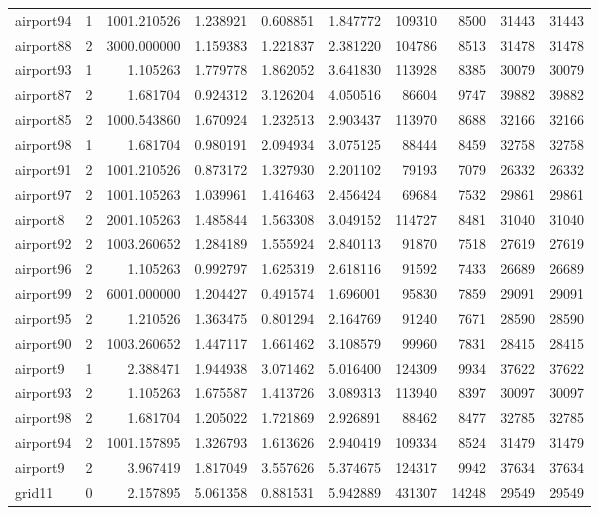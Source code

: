 \begin{longtable}{|l|r|r|r|r|r|r|r|r|r|}
airport94 & 1 & 1001.210526 & 1.238921 & 0.608851 & 1.847772 & 109310 & 8500 & 31443 & 31443 \\
airport88 & 2 & 3000.000000 & 1.159383 & 1.221837 & 2.381220 & 104786 & 8513 & 31478 & 31478 \\
airport93 & 1 & 1.105263 & 1.779778 & 1.862052 & 3.641830 & 113928 & 8385 & 30079 & 30079 \\
airport87 & 2 & 1.681704 & 0.924312 & 3.126204 & 4.050516 & 86604 & 9747 & 39882 & 39882 \\
airport85 & 2 & 1000.543860 & 1.670924 & 1.232513 & 2.903437 & 113970 & 8688 & 32166 & 32166 \\
airport98 & 1 & 1.681704 & 0.980191 & 2.094934 & 3.075125 & 88444 & 8459 & 32758 & 32758 \\
airport91 & 2 & 1001.210526 & 0.873172 & 1.327930 & 2.201102 & 79193 & 7079 & 26332 & 26332 \\
airport97 & 2 & 1001.105263 & 1.039961 & 1.416463 & 2.456424 & 69684 & 7532 & 29861 & 29861 \\
airport8 & 2 & 2001.105263 & 1.485844 & 1.563308 & 3.049152 & 114727 & 8481 & 31040 & 31040 \\
airport92 & 2 & 1003.260652 & 1.284189 & 1.555924 & 2.840113 & 91870 & 7518 & 27619 & 27619 \\
airport96 & 2 & 1.105263 & 0.992797 & 1.625319 & 2.618116 & 91592 & 7433 & 26689 & 26689 \\
airport99 & 2 & 6001.000000 & 1.204427 & 0.491574 & 1.696001 & 95830 & 7859 & 29091 & 29091 \\
airport95 & 2 & 1.210526 & 1.363475 & 0.801294 & 2.164769 & 91240 & 7671 & 28590 & 28590 \\
airport90 & 2 & 1003.260652 & 1.447117 & 1.661462 & 3.108579 & 99960 & 7831 & 28415 & 28415 \\
airport9 & 1 & 2.388471 & 1.944938 & 3.071462 & 5.016400 & 124309 & 9934 & 37622 & 37622 \\
airport93 & 2 & 1.105263 & 1.675587 & 1.413726 & 3.089313 & 113940 & 8397 & 30097 & 30097 \\
airport98 & 2 & 1.681704 & 1.205022 & 1.721869 & 2.926891 & 88462 & 8477 & 32785 & 32785 \\
airport94 & 2 & 1001.157895 & 1.326793 & 1.613626 & 2.940419 & 109334 & 8524 & 31479 & 31479 \\
airport9 & 2 & 3.967419 & 1.817049 & 3.557626 & 5.374675 & 124317 & 9942 & 37634 & 37634 \\
grid11 & 0 & 2.157895 & 5.061358 & 0.881531 & 5.942889 & 431307 & 14248 & 29549 & 29549 \\

\end{longtable}
